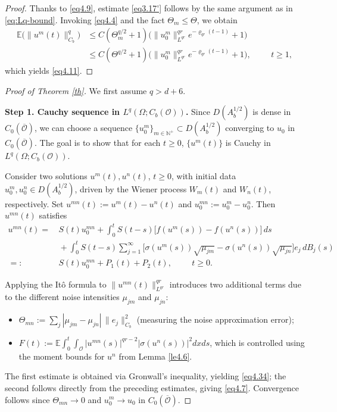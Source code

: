 \documentclass[10pt]{article}
\numberwithin{figure}{section}
\numberwithin{equation}{section}
\newcommand{\0}{{\theta}}
\def\O{\Theta}
\def\Hs{\hspace{1cm}}\def\hs{\hspace{0.5cm}}
\begin{document}
\begin{proof}
Thanks to \eqref{eq4.9}, estimate \eqref{eq3.17'} follows by the same argument as in \eqref{eq:Lq-bound}. 
\vs
Invoking \eqref{eq4.4} and the fact $\O_m\le\O$, we obtain
\begin{align*}
 \mathbb{E}\big(\| u^m(t) \|_{C_b}^q\big) 
&\le C (\Theta_m^{q/2} + 1) \big(\| u_0^m \|_{L^{qr}}^{qr} e^{-\varrho_{qr}(t-1)} + 1 \big) \\
&\le C (\Theta^{q/2} + 1) \big( \| u_0^m \|_{L^{qr}}^{qr} e^{-\varrho_{qr}(t-1)} + 1 \big), \Hs t \ge 1,
\end{align*}
which yields \eqref{eq4.11}.
\end{proof}

\begin{proof}[Proof of Theorem \ref{th}] We first assume $q>d+6$.

{\bf Step 1. Cauchy sequence in $L^q(\Omega;C_b(\mathcal{O}))$.} Since $D(A_b^{1/2})$ is dense in $C_0(\overline{\mathcal O})$, we can choose a sequence $\{u_0^m\}_{m\in\mathbb N^+}\subset D(A_b^{1/2})$ converging to $u_0$ in $C_0(\overline{\mathcal O})$. The goal is to show that for each $t\ge0$, $\{u^m(t)\}$ is Cauchy in $L^q(\Omega; C_b(\mathcal{O}))$.

 Consider two solutions $u^m(t), u^n(t)$, $t\ge0$, with initial data  
$u_0^m, u_0^n \in D(A_b^{1/2})$, driven by the Wiener process $W_m(t)$ and $W_n(t)$, respectively. 
Set $u^{mn}(t) := u^m(t) - u^n(t)$ and $u_0^{mn} := u_0^m-u_0^n$.  
Then $u^{mn}(t)$ satisfies  
\begin{equation*}
\begin{aligned}
u^{mn}(t)=&\, S(t) u_0^{mn} 
        + \int_0^t S(t-s) \big[ f(u^m(s)) - f(u^n(s)) \big] \, ds \\
     &\,+\int_0^t  S(t-s) \sum_{j=1}^\infty\big[ \sigma(u^m(s))\sqrt{\mu_{jm}} - \sigma(u^n(s))\sqrt{\mu_{jn}} \big]e_j \, dB_j(s)\\
     =:&\, S(t) u_0^{mn} +P_1(t)+P_2(t),\Hs t\ge0.
\end{aligned}
\end{equation*}

 
Applying the It\^o formula to $\|u^{mn}(t)\|_{L^{qr}}^{qr}$ introduces two additional terms due to the different noise intensities $\mu_{jm}$ and $\mu_{jn}$:
\begin{itemize}
    \item $\Theta_{mn}:=\sum_j |\mu_{jm}-\mu_{jn}|\,\|e_j\|_{C_b}^2$ (measuring the noise approximation error);
    \item $F(t):=\mathbb{E}\int_0^t\int_{\mathcal{O}} |u^{mn}(s)|^{qr-2}|\sigma(u^n(s))|^2 dxds$, which is controlled using the moment bounds for $u^n$ from Lemma \ref{le4.6}.
\end{itemize}
The first estimate is obtained via Gronwall's inequality, yielding \eqref{eq4.34}; the second follows directly from the preceding estimates, giving \eqref{eq4.7}. Convergence follows since $\Theta_{mn}\to0$ and $u_0^m\to u_0$ in $C_0(\overline{\mathcal{O}})$.


\end{proof}
\end{document}
